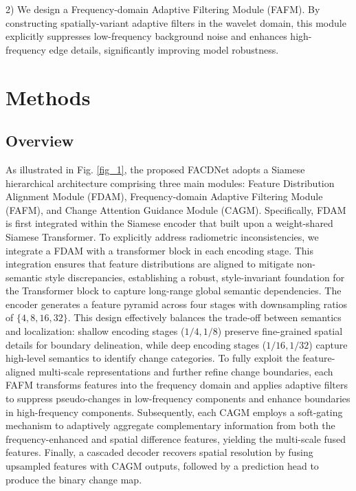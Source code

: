 \documentclass[lettersize,journal]{IEEEtran}
\begin{document}
2) We design a Frequency-domain Adaptive Filtering Module (FAFM). By constructing spatially-variant adaptive filters in the wavelet domain, this module explicitly suppresses low-frequency background noise and enhances high-frequency edge details, significantly improving model robustness.
\vspace{-5pt}
\section{Methods}
\vspace{-5pt}
\subsection{Overview}

As illustrated in Fig. \ref{fig_1}, the proposed FACDNet adopts a Siamese hierarchical architecture comprising three main modules: Feature Distribution Alignment Module (FDAM), Frequency-domain Adaptive Filtering Module (FAFM), and Change Attention Guidance Module (CAGM). Specifically, FDAM is first integrated within the Siamese encoder that built upon a weight-shared Siamese Transformer. To explicitly address radiometric inconsistencies, we integrate a FDAM with a transformer block in each encoding stage. This integration ensures that feature distributions are aligned to mitigate non-semantic style discrepancies, establishing a robust, style-invariant foundation for the Transformer block to capture long-range global semantic dependencies. The encoder generates a feature pyramid across four stages with downsampling ratios of $\{4, 8, 16, 32\}$. This design effectively balances the trade-off between semantics and localization: shallow encoding stages ($1/4, 1/8$) preserve fine-grained spatial details for boundary delineation, while deep encoding stages ($1/16, 1/32$) capture high-level semantics to identify change categories. To fully exploit the feature-aligned multi-scale representations and further refine change boundaries, each FAFM transforms features into the frequency domain and applies adaptive filters to suppress pseudo-changes in low-frequency components and enhance boundaries in high-frequency components. Subsequently, each CAGM employs a soft-gating mechanism to adaptively aggregate complementary information from both the frequency-enhanced and spatial difference features, yielding the multi-scale fused features. Finally, a cascaded decoder recovers spatial resolution by fusing upsampled features with CAGM outputs, followed by a prediction head to produce the binary change map.
\end{document}
